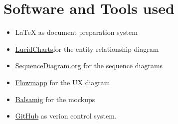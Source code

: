\documentclass{article}
\begin{document}
\section{Software and Tools used}
\begin{itemize}
      \item \LaTeX{} as document preparation system
      \item \href{https://lucidcharts.com/}{LucidCharts}for the entity relationship diagram 
      \item \href{https://sequencediagram.org}{SequenceDiagram.org} for the sequence diagrams
      \item \href{https://www.flowmapp.com/}{Flowmapp} for the UX diagram 
      \item \href{https://balsamiq.com}{Balsamig} for the mockups 
      \item \href{https://github.com/}{GitHub} as verion control system.
\end{itemize}


\end{document}

